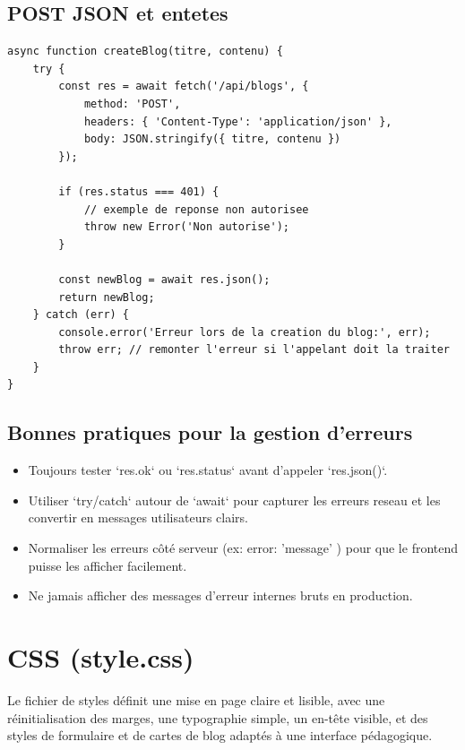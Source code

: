 \documentclass[a4paper,12pt]{book}
\begin{document}
\subsection{POST JSON et entetes}

\begin{lstlisting}[style=javascript,caption=Exemple fetch - POST avec JSON]
async function createBlog(titre, contenu) {
    try {
        const res = await fetch('/api/blogs', {
            method: 'POST',
            headers: { 'Content-Type': 'application/json' },
            body: JSON.stringify({ titre, contenu })
        });

        if (res.status === 401) {
            // exemple de reponse non autorisee
            throw new Error('Non autorise');
        }

        const newBlog = await res.json();
        return newBlog;
    } catch (err) {
        console.error('Erreur lors de la creation du blog:', err);
        throw err; // remonter l'erreur si l'appelant doit la traiter
    }
}
\end{lstlisting}

\subsection{Bonnes pratiques pour la gestion d'erreurs}

\begin{itemize}
    \item Toujours tester `res.ok` ou `res.status` avant d'appeler `res.json()`.
    \item Utiliser `try/catch` autour de `await` pour capturer les erreurs reseau et les convertir en messages utilisateurs clairs.
    \item Normaliser les erreurs c\^ot\'e serveur (ex: { error: 'message' }) pour que le frontend puisse les afficher facilement.
    \item Ne jamais afficher des messages d'erreur internes bruts en production.
\end{itemize}


\section{CSS (style.css)}

Le fichier de styles définit une mise en page claire et lisible, avec une réinitialisation des marges, une typographie simple, un en-tête visible, et des styles de formulaire et de cartes de blog adaptés à une interface pédagogique.
\end{document}
